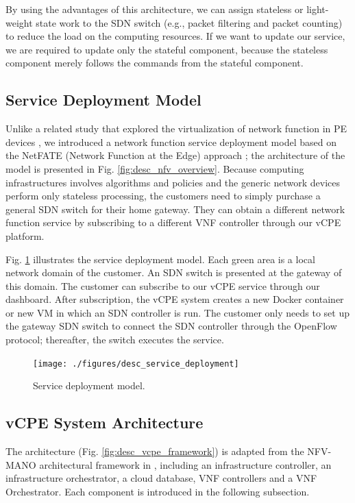 \documentclass[journal]{IEEEtran}
\begin{document}
By using the advantages of this architecture, we can assign stateless or light-weight state work to the SDN switch (e.g., packet filtering and packet counting) to reduce the load on the computing resources. If we want to update our service, we are required to update only the stateful component, because the stateless component merely follows the commands from the stateful component.



\subsection{Service Deployment Model}
Unlike a related study that explored the virtualization of network function in PE devices \cite{vcpe-enhance}, we introduced a network function service deployment model based on the NetFATE (Network Function at the Edge) approach \cite{netfate}; the architecture of the model is presented in Fig. \ref{fig:desc_nfv_overview}. Because computing infrastructures involves algorithms and policies and the generic network devices perform only stateless processing, the customers need to simply purchase a general SDN switch for their home gateway. They can obtain a different network function service by subscribing to a different VNF controller through our vCPE platform.

Fig. \ref{fig:desc_service_deployment} illustrates the service deployment model. Each green area is a local network domain of the customer. An SDN switch is presented at the gateway of this domain. The customer can subscribe to our vCPE service through our dashboard. After subscription, the vCPE system creates a new Docker container or new VM in which an SDN controller is run. The customer only needs to set up the gateway SDN switch to connect the SDN controller through the OpenFlow protocol; thereafter, the switch executes the service.

\begin{figure}[!t]
\centering
\texttt{[image: ./figures/desc\_service\_deployment]}
\caption{Service deployment model.}
\label{fig:desc_service_deployment}
\end{figure}



\subsection{vCPE System Architecture}
The architecture (Fig. \ref{fig:desc_vcpe_framework}) is adapted from the NFV-MANO architectural framework in \cite{nfv2014-v111}, including an infrastructure controller, an infrastructure orchestrator, a cloud database, VNF controllers and a VNF Orchestrator. Each component is introduced in the following subsection.
\end{document}
